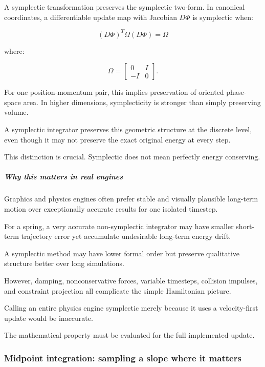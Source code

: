 A symplectic transformation preserves the symplectic two-form. In canonical coordinates, a differentiable update map with Jacobian \(D\Phi\) is symplectic when:

\[
\boxed{ (D\Phi)^T\Omega(D\Phi)=\Omega }
\]

where:

\[
\Omega= \begin{bmatrix} 0&I\\ -I&0 \end{bmatrix}.
\]

For one position-momentum pair, this implies preservation of oriented phase-space area. In higher dimensions, symplecticity is stronger than simply preserving volume.

A symplectic integrator preserves this geometric structure at the discrete level, even though it may not preserve the exact original energy at every step.

This distinction is crucial. Symplectic does not mean perfectly energy conserving.

\subparagraph{Why this matters in real engines}\label{02-foundations-ii-ch025-why-this-matters-in-real-engines}

Graphics and physics engines often prefer stable and visually plausible long-term motion over exceptionally accurate results for one isolated timestep.

For a spring, a very accurate non-symplectic integrator may have smaller short-term trajectory error yet accumulate undesirable long-term energy drift.

A symplectic method may have lower formal order but preserve qualitative structure better over long simulations.

However, damping, nonconservative forces, variable timesteps, collision impulses, and constraint projection all complicate the simple Hamiltonian picture.

Calling an entire physics engine symplectic merely because it uses a velocity-first update would be inaccurate.

The mathematical property must be evaluated for the full implemented update.

\subsubsection{Midpoint integration: sampling a slope where it matters}\label{02-foundations-ii-ch025-midpoint-integration-sampling-a-slope-where-it-matters}

